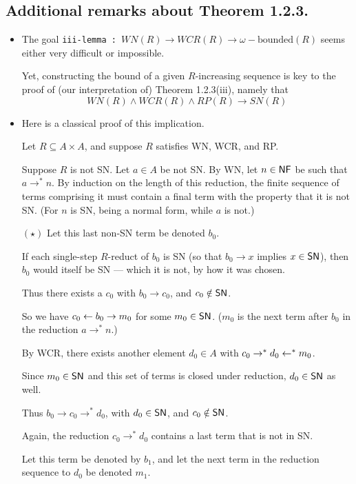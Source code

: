 \documentclass{scrartcl}
\begin{document}
\subsection*{Additional remarks about Theorem 1.2.3.}
\begin{itemize}

  \item The goal \texttt{iii-lemma :  $WN(R) \to WCR(R) \to \omega{-}\text{bounded}(R)$}
  seems either very difficult or impossible.


  Yet, constructing the bound of a given $R$-increasing sequence is key to the proof of
  (our interpretation of) Theorem 1.2.3(iii), namely that
  \[ WN(R) \land WCR(R) \land RP(R) \to SN(R) \tag{iii} \]
  \item Here is a classical proof of this implication.

  Let $R \subseteq A \times A$, and suppose $R$ satisfies WN, WCR, and RP.

  Suppose $R$ is not SN.  Let $a \in A$ be not SN.  By WN, let $n \in \mathsf{NF}$ be
  such that $a \to^* n$.  By induction on the length of this reduction, the finite sequence
  of terms comprising it must contain a final term with the property that
  it is not SN.  (For $n$ is SN, being a normal form, while $a$ is not.)

  $(\star)$ Let this last non-SN term be denoted $b_0$.

  If each single-step $R$-reduct of $b_0$ is SN (so that $b_0 \to x$ implies $x\in \mathsf{SN}$),
  then $b_0$ would itself be SN --- which it is not, by how it was chosen.

  Thus there exists a $c_0$ with $b_0 \to c_0$, and $c_0 \notin \mathsf{SN}$.

  So we have $c_0 \leftarrow b_0 \to m_0$ for some $m_0 \in \mathsf{SN}$. ($m_0$ is the next term after $b_0$ in the reduction $a \to^* n$.)

  By WCR, there exists another element $d_0 \in A$ with $c_0 \to^* d_0 \leftarrow^* m_0$.

  Since $m_0 \in \mathsf{SN}$ and this set of terms is closed under reduction, $d_0 \in \mathsf{SN}$ as well.

  Thus $b_0 \to c_0 \to^* d_0$, with $d_0 \in \mathsf{SN}$, and $c_0 \notin \mathsf{SN}$.

  Again, the reduction $c_0 \to^* d_0$ contains a last term that is not in SN.

  Let this term be denoted by $b_1$, and let the next term in the reduction sequence
  to $d_0$ be denoted $m_1$.


\end{itemize}
\end{document}
